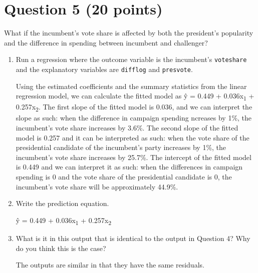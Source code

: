 \documentclass[12pt,letterpaper]{article}
\begin{document}
\section*{Question 5 (20 points)}
\noindent What if the incumbent's vote share is affected by both the president's popularity and the difference in spending between incumbent and challenger? 
	\begin{enumerate}
		\item Run a regression where the outcome variable is the incumbent's \texttt{voteshare} and the explanatory variables are \texttt{difflog} and \texttt{presvote}.
		
				
		
		Using the estimated coefficients and the summary statistics from the linear regression model, we can calculate the fitted model as \^{y} = 0.449 + 0.036x\textsubscript{1} + 0.257x\textsubscript{2}. The first slope of the fitted model is 0.036, and we can interpret the slope as such: when the difference in campaign spending ncreases by 1\%, the incumbent's vote share increases by 3.6\%. The second slope of the fitted model is 0.257 and it can be interpreted as such: when the vote share of the presidential candidate of the incumbent's party increases by 1\%, the incumbent's vote share increases by 25.7\%. The intercept of the fitted model is 0.449 and we can interpret it as such: when the differences in campaign spending is 0 and the vote share of the presidential candidate is 0, the incumbent's vote share will be approximately 44.9\%.
		
		\item Write the prediction equation.
		
		\^{y} = 0.449 + 0.036x\textsubscript{1} + 0.257x\textsubscript{2}
		
		\item What is it in this output that is identical to the output in Question 4? Why do you think this is the case?
		
		The outputs are similar in that they have the same residuals.
		
	\end{enumerate}
\end{document}
